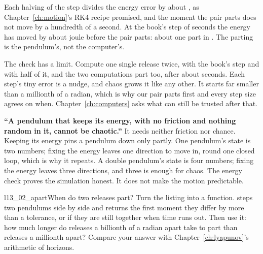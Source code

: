 

\noindent
Each halving of the step divides the energy error by about
, as Chapter~\ref{ch:motion}'s RK4 recipe promised,
and the moment the pair parts does not move by a hundredth of a second. At
the book's step of  seconds the energy has moved by about
 joule before the pair parts: about one part in
. The parting is the pendulum's, not the computer's.


\begin{note}
The check has a limit. Compute one single release twice, with the book's step
and with half of it, and the two computations part too, after about
 seconds. Each step's tiny error is a nudge, and chaos
grows it like any other. It starts far smaller than a millionth of a radian,
which is why our pair parts first and every step size agrees on when.
Chapter~\ref{ch:computers} asks what can still be trusted after that.
\end{note}

\begin{trapbox}
\textbf{\enquote{A pendulum that keeps its energy, with no friction and
nothing random in it, cannot be chaotic.}} It needs neither friction nor
chance. Keeping its energy pins a pendulum down only partly. One pendulum's
state is two numbers; fixing the energy leaves one direction to move in,
round one closed loop, which is why it repeats. A double pendulum's state is
four numbers; fixing the energy leaves three directions, and three is enough
for chaos. The energy check proves the simulation honest. It does not make the
motion predictable.
\end{trapbox}

\begin{lab}{l13_02_apart}{When do two releases part?}
Turn the listing into a function.  steps two
pendulums side by side and returns the first moment they differ by more than a
tolerance, or  if they are still together when time runs out. Then
use it: how much longer do releases a billionth of a radian apart take to
part than releases a millionth apart? Compare your answer with
Chapter~\ref{ch:lyapunov}'s arithmetic of horizons.
\end{lab}

